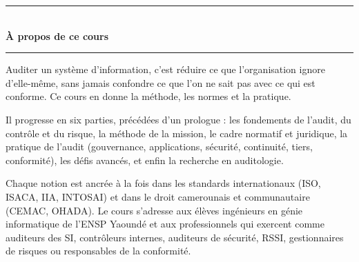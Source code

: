 \documentclass[12pt, twoside, openright, a4paper]{book}
\begin{document}

\vspace*{2.5cm}

\begin{center}
    {\color{CouleurAccent}\rule{0.6\linewidth}{1pt}}\\[1.5ex]
    {\color{white}\Large\bfseries À propos de ce cours}\\[1.5ex]
    {\color{CouleurAccent}\rule{0.6\linewidth}{1pt}}
\end{center}

\vspace{1cm}

\begin{center}
\begin{minipage}{0.75\textwidth}
\color{white!85!gray}
Auditer un système d'information, c'est réduire ce que l'organisation
ignore d'elle-même, sans jamais confondre ce que l'on ne sait pas avec ce
qui est conforme. Ce cours en donne la méthode, les normes et la pratique.

\medskip

Il progresse en six parties, précédées d'un prologue : les fondements de
l'audit, du contrôle et du risque, la méthode de la mission, le cadre
normatif et juridique, la pratique de l'audit (gouvernance, applications,
sécurité, continuité, tiers, conformité), les défis avancés, et enfin la
recherche en auditologie.

\medskip

Chaque notion est ancrée à la fois dans les standards internationaux (ISO,
ISACA, IIA, INTOSAI) et dans le droit camerounais et communautaire (CEMAC,
OHADA). Le cours s'adresse aux élèves ingénieurs en génie informatique de
l'ENSP Yaoundé et aux professionnels qui exercent comme auditeurs des SI,
contrôleurs internes, auditeurs de sécurité, RSSI, gestionnaires de risques
ou responsables de la conformité.
\end{minipage}
\end{center}

\vfill
\end{document}
